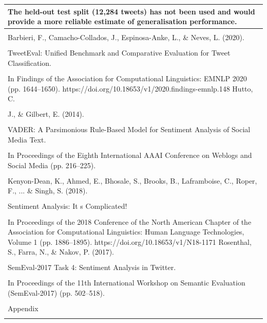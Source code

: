 \documentclass[11pt]{article}
\begin{document}
\begin{longtable}{|p{\dimexpr\linewidth-2\tabcolsep-2\arrayrulewidth\relax}|}
\hline
The held-out test split (12,284 tweets) has not been used and would provide a more reliable estimate of generalisation performance. \\[2pt]
\hline
\rule{0pt}{3.5cm} \\
\hline
Barbieri, F., Camacho-Collados, J., Espinosa-Anke, L., \& Neves, L. (2020). \\[2pt]
\hline
\rule{0pt}{3.5cm} \\
\hline
TweetEval: Unified Benchmark and Comparative Evaluation for Tweet Classification. \\[2pt]
\hline
\rule{0pt}{3.5cm} \\
\hline
In Findings of the Association for Computational Linguistics: EMNLP 2020 (pp. 1644--1650). https://doi.org/10.18653/v1/2020.findings-emnlp.148 Hutto, C. \\[2pt]
\hline
\rule{0pt}{3.5cm} \\
\hline
J., \& Gilbert, E. (2014). \\[2pt]
\hline
\rule{0pt}{3.5cm} \\
\hline
VADER: A Parsimonious Rule-Based Model for Sentiment Analysis of Social Media Text. \\[2pt]
\hline
\rule{0pt}{3.5cm} \\
\hline
In Proceedings of the Eighth International AAAI Conference on Weblogs and Social Media (pp. 216--225). \\[2pt]
\hline
\rule{0pt}{3.5cm} \\
\hline
Kenyon-Dean, K., Ahmed, E., Bhosale, S., Brooks, B., Laframboise, C., Roper, F., ... \& Singh, S. (2018). \\[2pt]
\hline
\rule{0pt}{3.5cm} \\
\hline
Sentiment Analysis: It s Complicated! \\[2pt]
\hline
\rule{0pt}{3.5cm} \\
\hline
In Proceedings of the 2018 Conference of the North American Chapter of the Association for Computational Linguistics: Human Language Technologies, Volume 1 (pp. 1886--1895). https://doi.org/10.18653/v1/N18-1171 Rosenthal, S., Farra, N., \& Nakov, P. (2017). \\[2pt]
\hline
\rule{0pt}{3.5cm} \\
\hline
SemEval-2017 Task 4: Sentiment Analysis in Twitter. \\[2pt]
\hline
\rule{0pt}{3.5cm} \\
\hline
In Proceedings of the 11th International Workshop on Semantic Evaluation (SemEval-2017) (pp. 502--518). \\[2pt]
\hline
\rule{0pt}{3.5cm} \\
\hline
Appendix \\[2pt]
\hline
\rule{0pt}{3.5cm} \\
\hline
\end{longtable}
\end{document}
